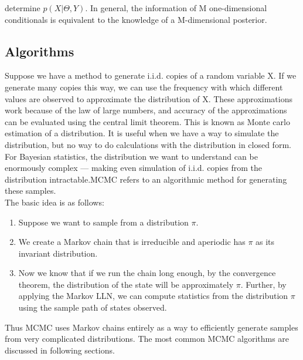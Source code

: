 \documentclass[letterpaper]{article}
\begin{document}
determine $p(X|\Theta,Y)$. In general, the information of M one-dimensional conditionals is equivalent to the knowledge of a M-dimensional posterior.

\subsection{Algorithms}
Suppose we have a method to generate i.i.d. copies of a random variable X. If we generate many copies this way, we can use the frequency with which different values are observed to approximate the distribution of X. These approximations work because of the law of large numbers, and accuracy of the approximations can be evaluated using the central limit theorem. This is known as Monte carlo estimation of a distribution. It is useful when we have a way to simulate the distribution, but no way to do calculations with the distribution in closed form. \\

For Bayesian statistics, the distribution we want to understand can be enormously complex — making even simulation of i.i.d. copies from the distribution intractable.MCMC refers to an algorithmic method for generating these samples. \\
The basic idea is as follows:
\begin{enumerate}
\item Suppose we want to sample from a distribution $\pi$.
\item We create a Markov chain that is irreducible and aperiodic has $\pi$ as its invariant distribution.
\item Now we know that if we run the chain long enough, by the convergence theorem, the distribution of the state will be approximately $\pi$. Further, by applying the Markov LLN, we can compute statistics from the distribution $\pi$ using the sample path of states observed.
\end{enumerate}

Thus MCMC uses Markov chains entirely as a way to efficiently generate samples from very complicated distributions. The most common MCMC algorithms are discussed in following sections.  
\end{document}
